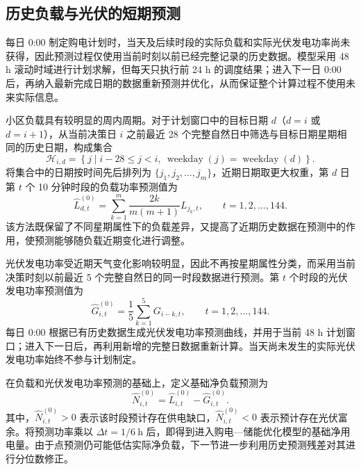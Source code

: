 \documentclass[12pt,a4paper]{ctexart}
\begin{document}
\subsection{历史负载与光伏的短期预测}
每日 0:00 制定购电计划时，当天及后续时段的实际负载和实际光伏发电功率尚未获得，因此预测过程仅使用当前时刻以前已经完整记录的历史数据。模型采用 48 h 滚动时域进行计划求解，但每天只执行前 24 h 的调度结果；进入下一日 0:00 后，再纳入最新完成日期的数据重新预测并优化，从而保证整个计算过程不使用未来实际信息。

\par\noindent\hspace*{2em}小区负载具有较明显的周内周期。对于计划窗口中的目标日期 $d$（$d=i$ 或 $d=i+1$），从当前决策日 $i$ 之前最近 28 个完整自然日中筛选与目标日期星期相同的历史日期，构成集合
\begin{equation}
\mathcal{H}_{i,d}=\left\{j\mid i-28\leq j<i,\ \operatorname{weekday}(j)=\operatorname{weekday}(d)\right\}.
\end{equation}
将集合中的日期按时间先后排列为 $\{j_1,j_2,\ldots,j_m\}$，近期日期取更大权重，第 $d$ 日第 $t$ 个 10 分钟时段的负载功率预测值为
\begin{equation}
\widehat{L}_{d,t}^{(0)}=\sum_{k=1}^{m}\frac{2k}{m(m+1)}L_{j_k,t},\qquad t=1,2,\ldots,144.
\end{equation}
该方法既保留了不同星期属性下的负载差异，又提高了近期历史数据在预测中的作用，使预测能够随负载近期变化进行调整。

\par\noindent\hspace*{2em}光伏发电功率受近期天气变化影响较明显，因此不再按星期属性分类，而采用当前决策时刻以前最近 5 个完整自然日的同一时段数据进行预测。第 $t$ 个时段的光伏发电功率预测值为
\begin{equation}
\widehat{G}_{i,t}^{(0)}=\frac{1}{5}\sum_{k=1}^{5}G_{i-k,t},\qquad t=1,2,\ldots,144.
\end{equation}
每日 0:00 根据已有历史数据生成光伏发电功率预测曲线，并用于当前 48 h 计划窗口；进入下一日后，再利用新增的完整日数据重新计算。当天尚未发生的实际光伏发电功率始终不参与计划制定。

\par\noindent\hspace*{2em}在负载和光伏发电功率预测的基础上，定义基础净负载预测为
\begin{equation}
\widehat{N}_{i,t}^{(0)}=\widehat{L}_{i,t}^{(0)}-\widehat{G}_{i,t}^{(0)}.
\end{equation}
其中，$\widehat{N}_{i,t}^{(0)}>0$ 表示该时段预计存在供电缺口，$\widehat{N}_{i,t}^{(0)}<0$ 表示预计存在光伏富余。将预测功率乘以 $\Delta t=1/6\ \mathrm{h}$ 后，即得到进入购电—储能优化模型的基础净用电量。由于点预测仍可能低估实际净负载，下一节进一步利用历史预测残差对其进行分位数修正。
\end{document}
